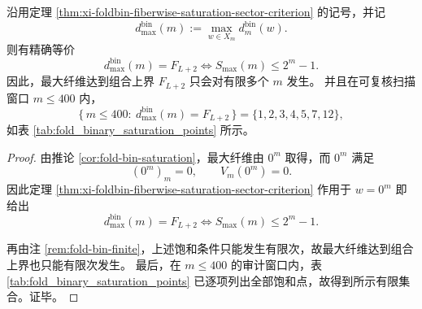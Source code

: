 \begin{corollary}[最大纤维饱和的精确等价条件与仅有限次发生]\label{cor:xi-foldbin-maxfiber-saturation-finite-occurrence}
沿用定理 \ref{thm:xi-foldbin-fiberwise-saturation-sector-criterion} 的记号，并记
\[
d_{\max}^{\mathrm{bin}}(m):=
\max_{w\in X_m}d_m^{\mathrm{bin}}(w).
\]
则有精确等价
\[
d_{\max}^{\mathrm{bin}}(m)=F_{L+2}
\iff
S_{\max}(m)\le 2^m-1.
\]
因此，最大纤维达到组合上界 \(F_{L+2}\) 只会对有限多个 \(m\) 发生。
并且在可复核扫描窗口 \(m\le 400\) 内，
\[
\{\,m\le 400:\ d_{\max}^{\mathrm{bin}}(m)=F_{L+2}\,\}
=
\{1,2,3,4,5,7,12\},
\]
如表 \ref{tab:fold_binary_saturation_points} 所示。
\end{corollary}
\begin{proof}
由推论 \ref{cor:fold-bin-saturation}，最大纤维由 \(0^m\) 取得，而 \(0^m\) 满足
\[
(0^m)_m=0,
\qquad
V_m(0^m)=0.
\]
因此定理 \ref{thm:xi-foldbin-fiberwise-saturation-sector-criterion} 作用于 \(w=0^m\) 即给出
\[
d_{\max}^{\mathrm{bin}}(m)=F_{L+2}
\iff
S_{\max}(m)\le 2^m-1.
\]

再由注 \ref{rem:fold-bin-finite}，上述饱和条件只能发生有限次，故最大纤维达到组合上界也只能有限次发生。
最后，在 \(m\le 400\) 的审计窗口内，表 \ref{tab:fold_binary_saturation_points} 已逐项列出全部饱和点，故得到所示有限集合。证毕。
\end{proof}



\endinput
